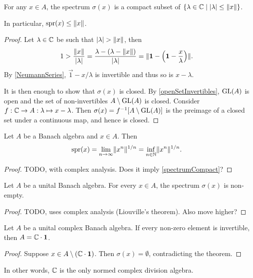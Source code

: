 \begin{proposition} \label{spectrumCompact}
For any $x\in A$, the spectrum $\sigma(x)$ is a compact subset of $\left\{ \lambda\in\mathbb{C} \;\middle|\; |\lambda|\leq \lVert x\rVert \right\}$.

In particular, $\operatorname{spr}(x) \leq \lVert x\rVert$.
\end{proposition}
\begin{proof}
Let $\lambda\in \mathbb{C}$ be such that $|\lambda|>\norm{x}$, then
\[ 1 > \frac{\lVert x\rVert}{|\lambda|} = \frac{\lambda - (\lambda - \lVert x\rVert)}{|\lambda|} = \lVert\boldsymbol{\mathrm{1}} - \left(\boldsymbol{\mathrm{1}} - \frac{x}{\lambda}\right)\rVert. \]
By \ref{NeumannSeries}, $\vec{1} - x/\lambda$ is invertible and thus so is $x-\lambda$.

It is then enough to show that $\sigma(x)$ is closed. By \ref{openSetInvertibles}, $\operatorname{GL}(A)$ is open and the set of non-invertibles $A\setminus \operatorname{GL}(A)$ is closed. Consider $f: \mathbb{C} \to A: \lambda \mapsto x-\lambda$. Then $\sigma(x) = f^{-1}[A\setminus \operatorname{GL}(A)]$ is the preimage of a closed set under a continuous map, and hence is closed.
\end{proof}

\begin{proposition} \label{spectralRadiusFormula}
Let $A$ be a Banach algebra and $x\in A$. Then
\[ \operatorname{spr}(x) = \lim_{n\to\infty}\lVert x^n\rVert^{1/n} = \inf_{n\in\mathbb{N}}\lVert x^n\rVert^{1/n}. \]
\end{proposition}
\begin{proof}
TODO, with complex analysis. Does it imply \ref{spectrumCompact}?
\end{proof}

\begin{theorem}
Let $A$ be a unital Banach algebra. For every $x\in A$, the spectrum $\sigma(x)$ is non-empty.
\end{theorem}
\begin{proof}
TODO, uses complex analysis (Liouville's theorem). Also move higher?
\end{proof}
\begin{corollary} \label{GelfandMazur}
Let $A$ be a unital complex Banach algebra. If every non-zero element is invertible, then $A=\mathbb{C}\cdot \boldsymbol{\mathrm{1}}$.
\end{corollary}
\begin{proof}
Suppose $x\in A\setminus (\mathbb{C}\cdot\boldsymbol{\mathrm{1}})$. Then $\sigma(x) = \emptyset$, contradicting the theorem.
\end{proof}
In other words, $\mathbb{C}$ is the only normed complex division algebra.

